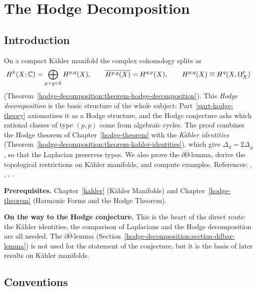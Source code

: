 \chapter{The Hodge Decomposition}\label{hodge-decomposition}

\section{Introduction}\label{hodge-decomposition:section-introduction}

On a compact K\"ahler manifold the complex cohomology splits as
\[
H^k(X; \mathbb{C}) = \bigoplus_{p+q=k}H^{p,q}(X), \qquad \overline{H^{p,q}(X)} = H^{q,p}(X), \qquad H^{p,q}(X) \cong H^q(X, \Omega^p_X)
\]
(Theorem~\ref{hodge-decomposition:theorem-hodge-decomposition}). This \emph{Hodge decomposition} is the basic structure of the whole
subject: Part~\ref{part-hodge-theory} axiomatises it as a Hodge structure, and the Hodge conjecture asks which rational classes of type
$(p,p)$ come from algebraic cycles. The proof combines the Hodge theorem of Chapter~\ref{hodge-theorem} with the \emph{K\"ahler identities}
(Theorem~\ref{hodge-decomposition:theorem-kahler-identities}), which give $\Delta_d = 2\Delta_{\bar\partial}$, so that the Laplacian
preserves types. We also prove the $\partial\bar\partial$-lemma, derive the topological restrictions on K\"ahler manifolds, and compute
examples. References: \cite[Chapter 0, Sections 6--7]{griffiths-harris}, \cite[Chapter 3]{huybrechts-complex},
\cite[Chapter 6]{voisin-hodge-1}, \cite[Chapter V]{wells-differential-analysis}.

\noindent\textbf{Prerequisites.} Chapter~\ref{kahler} (K\"ahler Manifolds) and Chapter~\ref{hodge-theorem} (Harmonic Forms and the Hodge
Theorem).

\noindent\textbf{On the way to the Hodge conjecture.} This is the heart of the direct route: the K\"ahler identities, the comparison of Laplacians and the Hodge decomposition are all needed.
The $\partial\bar\partial$-lemma (Section~\ref{hodge-decomposition:section-ddbar-lemma}) is not used for the statement of the conjecture, but it is the basis of later results on K\"ahler manifolds.

\section{Conventions}\label{hodge-decomposition:section-conventions}

